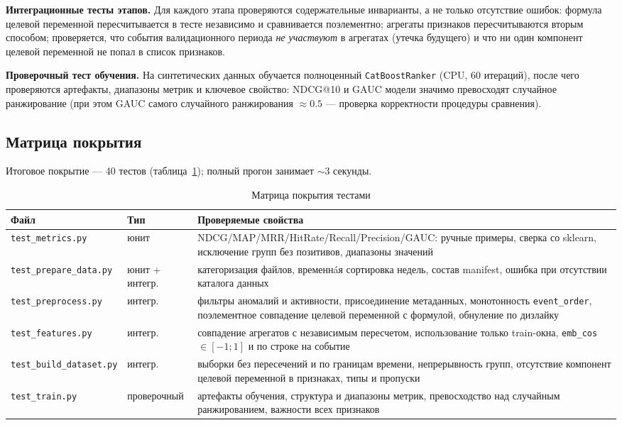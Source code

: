 \textbf{Интеграционные тесты этапов.}
Для каждого этапа проверяются содержательные инварианты, а не только отсутствие ошибок: формула целевой переменной пересчитывается в тесте независимо и сравнивается поэлементно; агрегаты признаков пересчитываются вторым способом; проверяется, что события валидационного периода \emph{не участвуют} в агрегатах (утечка будущего) и что ни один компонент целевой переменной не попал в список признаков.

\textbf{Проверочный тест обучения.}
На синтетических данных обучается полноценный \texttt{CatBoostRanker} (CPU, 60 итераций), после чего проверяются артефакты, диапазоны метрик и ключевое свойство: NDCG@10 и GAUC модели значимо превосходят случайное ранжирование (при этом GAUC самого случайного ранжирования $\approx 0.5$ --- проверка корректности процедуры сравнения).

\subsection{Матрица покрытия}

Итоговое покрытие --- 40 тестов (таблица~\ref{tab:test-coverage}); полный прогон занимает $\sim$3 секунды.

\begin{table}[H]
\centering
\caption{Матрица покрытия тестами}
\label{tab:test-coverage}
\small
\begin{tabularx}{\textwidth}{@{}l l X@{}}
\toprule
\textbf{Файл} & \textbf{Тип} & \textbf{Проверяемые свойства} \\
\midrule
\texttt{test\_metrics.py} & юнит & NDCG/MAP/MRR/HitRate/Recall/Precision/GAUC: ручные примеры, сверка со sklearn, исключение групп без позитивов, диапазоны значений \\
\texttt{test\_prepare\_data.py} & юнит + интегр. & категоризация файлов, временнáя сортировка недель, состав manifest, ошибка при отсутствии каталога данных \\
\texttt{test\_preprocess.py} & интегр. & фильтры аномалий и активности, присоединение метаданных, монотонность \texttt{event\_order}, поэлементное совпадение целевой переменной с формулой, обнуление по дизлайку \\
\texttt{test\_features.py} & интегр. & совпадение агрегатов с независимым пересчетом, использование только train-окна, \texttt{emb\_cos} $\in [-1;1]$ и по строке на событие \\
\texttt{test\_build\_dataset.py} & интегр. & выборки без пересечений и по границам времени, непрерывность групп, отсутствие компонент целевой переменной в признаках, типы и пропуски \\
\texttt{test\_train.py} & проверочный & артефакты обучения, структура и диапазоны метрик, превосходство над случайным ранжированием, важности всех признаков \\
\bottomrule
\end{tabularx}
\end{table}

